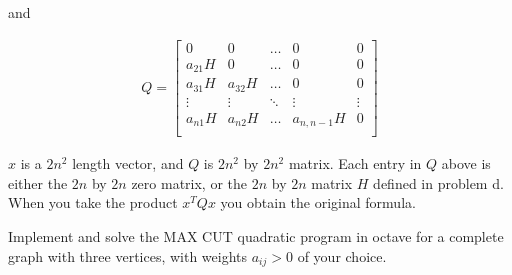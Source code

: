 \documentclass[fleqn]{homework}
\begin{document}
\begin{problem}{3}
\begin{enumerate}[a.]
      and

      \begin{align*}
        Q = \begin{bmatrix*} 
          0 & 0 & \dots & 0 & 0 \\
          a_{21} H & 0 & \dots & 0 & 0 \\
          a_{31} H & a_{32} H & \dots & 0 & 0 \\
          \vdots & \vdots & \ddots & \vdots & \vdots \\
          a_{n1} H & a_{n2} H & \dots & a_{n,n-1}H & 0 \\
        \end{bmatrix*}
      \end{align*}

      $x$ is a $2n^2$ length vector, and $Q$ is $2n^2$ by $2n^2$ matrix.  Each
      entry in $Q$ above is either the $2n$ by $2n$ zero matrix, or the $2n$ by
      $2n$ matrix $H$ defined in problem d.  When you take the product $x^T Q x$
      you obtain the original formula.
    \end{enumerate}
  \end{problem}

  \begin{problem}{4}
    \begin{question}
      Implement and solve the MAX CUT quadratic program in octave for a complete
      graph with three vertices, with weights $a_{ij} > 0$ of your choice.
    \end{question}
  \end{problem}
\end{document}
